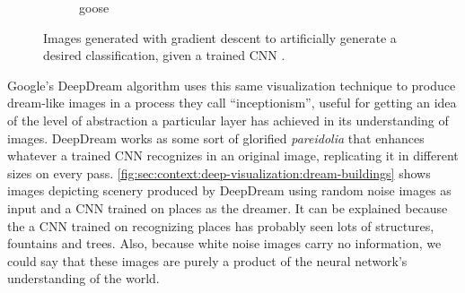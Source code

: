 \begin{figure}[t]
\begin{subfigure}[b]{0.3\textwidth}
    \caption{goose}
    \label{fig:sec:context:deep-visualization-class-6}
  \end{subfigure}
  \caption{
    Images generated with gradient descent to artificially generate a desired classification, given a trained CNN \cite{Simonyan2014B}.
  }
  \label{fig:sec:context:deep-visualization-class}
\end{figure}

Google's DeepDream algorithm \cite{Mordvintsev2015} uses this same visualization technique to produce dream-like images in a process they call ``inceptionism'', useful for getting an idea of the level of abstraction a particular layer has achieved in its understanding of images.
DeepDream works as some sort of glorified \emph{pareidolia} that enhances whatever a trained CNN recognizes in an original image, replicating it in different sizes on every pass.
\autoref{fig:sec:context:deep-visualization:dream-buildings} shows images depicting scenery produced by DeepDream using random noise images as input and a CNN trained on places as the dreamer.
It can be explained because the a CNN trained on recognizing places has probably seen lots of structures, fountains and trees.
Also, because white noise images carry no information, we could say that these images are purely a product of the neural network's understanding of the world.

